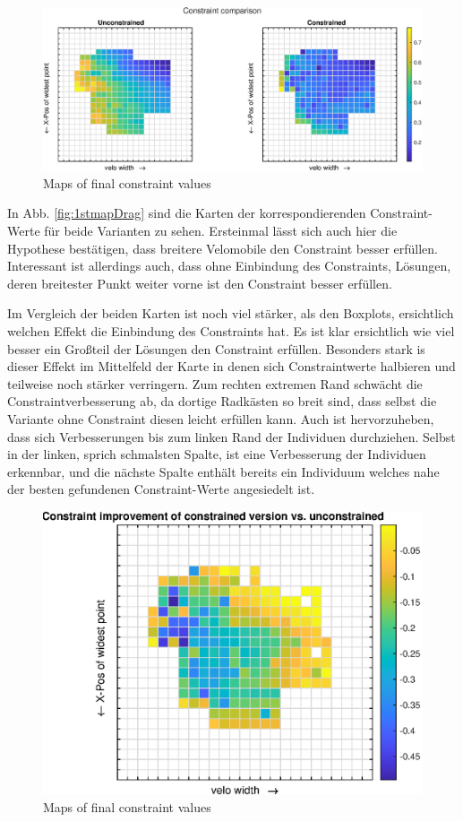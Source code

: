 \begin{figure}[h]
	\includegraphics[width=1\linewidth]{bilder/2pt500Samples/constraintMapComparison}
	\caption{Maps of final constraint values}
	\label{fig:1stmapCon}
\end{figure}

In Abb. \cref{fig:1stmapDrag} sind die Karten der korrespondierenden Constraint-Werte für beide Varianten zu sehen.
Ersteinmal lässt sich auch hier die Hypothese bestätigen, dass breitere Velomobile den Constraint besser erfüllen.
Interessant ist allerdings auch, dass ohne Einbindung des Constraints, Lösungen, deren breitester Punkt weiter vorne ist den Constraint besser erfüllen.

Im Vergleich der beiden Karten ist noch viel stärker, als den Boxplots, ersichtlich welchen Effekt die Einbindung des Constraints hat.
Es ist klar ersichtlich wie viel besser ein Großteil der Lösungen den Constraint erfüllen.
Besonders stark is dieser Effekt im Mittelfeld der Karte in denen sich Constraintwerte halbieren und teilweise noch stärker verringern.
Zum rechten extremen Rand schwächt die Constraintverbesserung ab, da dortige Radkästen so breit sind, dass selbst die Variante ohne Constraint diesen leicht erfüllen kann.
Auch ist hervorzuheben, dass sich Verbesserungen bis zum linken Rand der Individuen durchziehen.
Selbst in der linken, sprich schmalsten Spalte, ist eine Verbesserung der Individuen erkennbar, und die nächste Spalte enthält bereits ein Individuum welches nahe der besten gefundenen Constraint-Werte angesiedelt ist.

\begin{figure}[h]
	\centering
	\includegraphics[width=.7\linewidth]{bilder/2pt500Samples/constraintImprovements}
	\caption{Maps of final constraint values}
	\label{fig:1stmapConCompare}
\end{figure}

